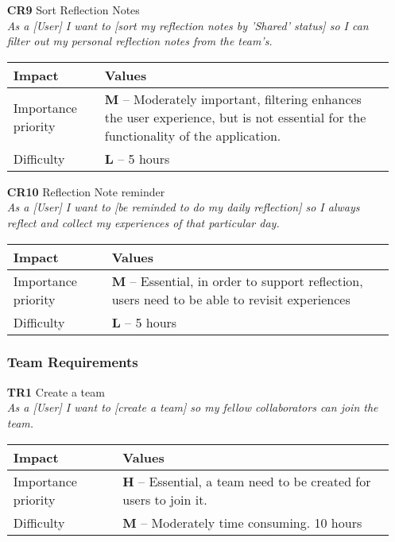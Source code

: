 \begin{itemize}
    \item[\textbf{CR9}] Sort Reflection Notes\\
        \textit{\small{As a [User] I want to [sort my reflection notes by 'Shared' status] so I can filter out my personal reflection notes from the team's.}}

        \begin{tabular}{| l | p{8cm} |}
            \hline
            \rowcolor[gray]{0.8}
            \textbf{Impact} & \textbf{Values} \\
            \hline
            Importance priority & \textbf{M} -- Moderately important, filtering enhances the user experience, but is not essential for the functionality of the application.\\
            Difficulty & \textbf{L} -- 5 hours\\
            \hline
        \end{tabular}
    \vspace{0.5cm}

    \item[\textbf{CR10}] Reflection Note reminder\\
        \textit{\small{As a [User] I want to [be reminded to do my daily reflection] so I always reflect and collect my experiences of that particular day.}}

        \begin{tabular}{| l | p{8cm} |}
            \hline
            \rowcolor[gray]{0.8}
            \textbf{Impact} & \textbf{Values} \\
            \hline
            Importance priority & \textbf{M} -- Essential, in order to support reflection, users need to be able to revisit experiences\\
            Difficulty & \textbf{L} -- 5 hours\\
            \hline
        \end{tabular}
    \vspace{0.5cm}

    \subsubsection{Team Requirements}
    \item[\textbf{TR1}] Create a team\\
        \textit{\small{As a [User] I want to [create a team] so my fellow collaborators can join the team.}}

        \begin{tabular}{| l | p{8cm} |}
            \hline
            \rowcolor[gray]{0.8}
            \textbf{Impact} & \textbf{Values} \\
            \hline
            Importance priority & \textbf{H} -- Essential, a team need to be created for users to join it.\\
            Difficulty & \textbf{M} -- Moderately time consuming. 10 hours\\
            \hline
        \end{tabular}
    \vspace{0.5cm}


\end{itemize}

